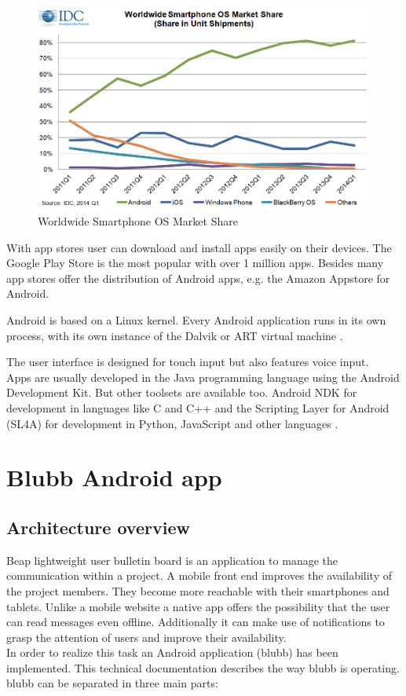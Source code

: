 \documentclass[12pt,a4paper,oneside]{report}
\newcommand{\appname}{blubb}
\begin{document}
\begin{figure}[!ht]
    \includegraphics[width=\linewidth]{chart-ww-smartphone-os-market-share.png}
	\caption{Worldwide Smartphone OS Market Share} 
\end{figure}

With app stores user can download and install apps easily on their devices. The Google Play Store is the most popular with over 1 million apps. Besides many app stores offer the distribution of Android apps, e.g. the Amazon Appstore for Android. 

Android is based on a Linux kernel. Every Android application runs in its own process, with its own instance of the Dalvik or ART
virtual machine \citep{gandhewar2010google}. 

The user interface is designed for touch input but also features voice input.  \\

Apps are usually developed in the Java programming language using the Android Development Kit. But other toolsets are available too. Android NDK for development in languages like C and C++ \citep{aDefNDK} and the Scripting Layer for Android (SL4A) for development in Python, JavaScript and other languages \citep{androidScripting}.

\chapter{Blubb Android app}
\section{Architecture overview}
 Beap lightweight user bulletin board is an application to manage the communication within a project. A mobile front end improves the availability of the project members. They become more reachable with their smartphones and tablets. Unlike a mobile website a native app offers the possibility that the user can read messages even offline. Additionally it can make use of notifications to grasp the attention of users and improve their availability. \\
In order to realize this task an Android application (\appname{}) has been implemented. This technical documentation describes the way  \appname{} is operating.\\
\appname{} can be separated in three main parts: 
\end{document}
